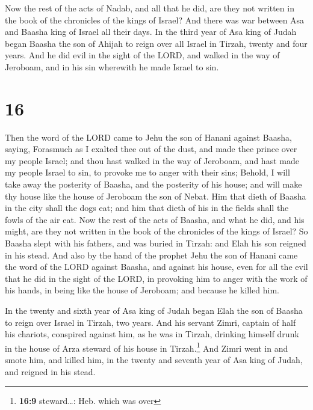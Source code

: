  Now the rest of the acts of Nadab, and all that he did,
are they not written in the book of the chronicles of the kings of
Israel?  And there was war between Asa and Baasha king of
Israel all their days.  In the third year of Asa king of
Judah began Baasha the son of Ahijah to reign over all Israel in Tirzah,
twenty and four years.  And he did evil in the sight of
the LORD, and walked in the way of Jeroboam, and in his sin wherewith he
made Israel to sin.

\hypertarget{section-15}{%
\section{16}\label{section-15}}

 Then the word of the LORD came to Jehu the son of Hanani
against Baasha, saying,  Forasmuch as I exalted thee out
of the dust, and made thee prince over my people Israel; and thou hast
walked in the way of Jeroboam, and hast made my people Israel to sin, to
provoke me to anger with their sins;  Behold, I will take
away the posterity of Baasha, and the posterity of his house; and will
make thy house like the house of Jeroboam the son of Nebat.
 Him that dieth of Baasha in the city shall the dogs eat;
and him that dieth of his in the fields shall the fowls of the air eat.
 Now the rest of the acts of Baasha, and what he did, and
his might, are they not written in the book of the chronicles of the
kings of Israel?  So Baasha slept with his fathers, and
was buried in Tirzah: and Elah his son reigned in his stead.
 And also by the hand of the prophet Jehu the son of
Hanani came the word of the LORD against Baasha, and against his house,
even for all the evil that he did in the sight of the LORD, in provoking
him to anger with the work of his hands, in being like the house of
Jeroboam; and because he killed him.

 In the twenty and sixth year of Asa king of Judah began
Elah the son of Baasha to reign over Israel in Tirzah, two years.
 And his servant Zimri, captain of half his chariots,
conspired against him, as he was in Tirzah, drinking himself drunk in
the house of Arza steward of his house in Tirzah.\footnote{\textbf{16:9}
  steward\ldots: Heb. which was over}  And Zimri went in
and smote him, and killed him, in the twenty and seventh year of Asa
king of Judah, and reigned in his stead.

